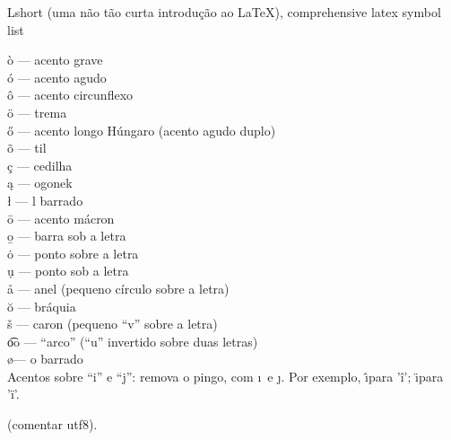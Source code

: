 \documentclass[12pt]{memoir}
\begin{document}
Lshort (uma não tão curta introdução
ao \LaTeX), 
comprehensive latex symbol list




















\newpage

\noindent 
\`{o} --- acento grave        \\
\'{o} --- acento agudo        \\
\^{o} --- acento circunflexo  \\
\"{o} --- trema               \\
\H{o} --- acento longo Húngaro (acento agudo duplo)                  \\
\~{o} --- til                 \\
\c{c} --- cedilha             \\
\k{a} --- ogonek              \\
\l{}  --- l barrado           \\
\={o} --- acento mácron	    \\
\b{o} --- barra sob  a letra  \\
\.{o} --- ponto sobre a letra \\
\d{u} --- ponto sob a letra   \\
\r{a} --- anel (pequeno círculo sobre a letra)             \\
\u{o} --- bráquia  \\
\v{s} --- caron (pequeno ``v'' sobre a letra)             \\
\t{oo} --- ``arco'' (``u'' invertido sobre duas letras) \\
\o --- o barrado   \\

Acentos sobre ``i'' e ``j'': 
remova o pingo, com \i\ e \j.
Por exemplo,
\^\i para  'î';
\"\i para 'ï'.

(comentar utf8).
\end{document}
